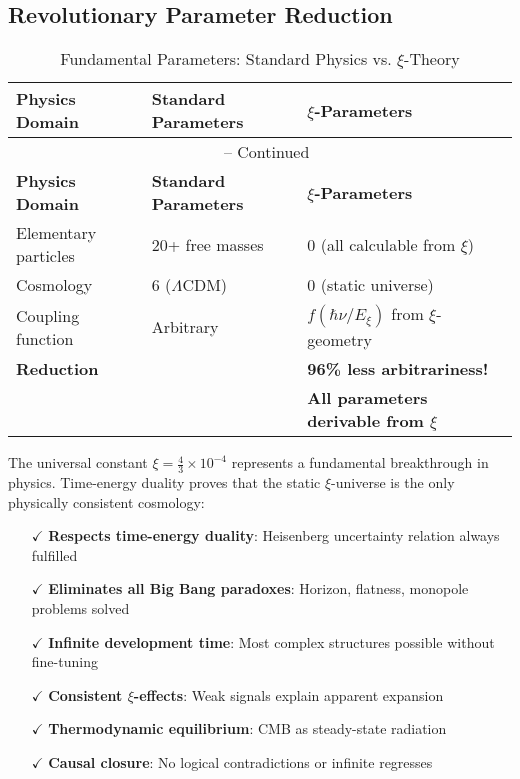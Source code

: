 \documentclass[12pt,a4paper]{article}
\theoremstyle{definition}
\begin{document}
	\subsection{Revolutionary Parameter Reduction}
	
	\begin{longtable}{lll}
		\caption{Fundamental Parameters: Standard Physics vs. $\xi$-Theory} \\
		\toprule
		\textbf{Physics Domain} & \textbf{Standard Parameters} & \textbf{$\xi$-Parameters} \\
		\midrule
		\endfirsthead
		\multicolumn{3}{c}{\tablename\ \thetable{} -- Continued} \\
		\toprule
		\textbf{Physics Domain} & \textbf{Standard Parameters} & \textbf{$\xi$-Parameters} \\
		\midrule
		\endhead
		Elementary particles & 20+ free masses & 0 (all calculable from $\xi$) \\
		Cosmology & 6 ($\Lambda$CDM) & 0 (static universe) \\
		Coupling function & Arbitrary & $f(\hbar\nu/E_\xi)$ from $\xi$-geometry \\
		\midrule
		\textbf{Reduction} & & \textbf{96\% less arbitrariness!} \\
		& & \textbf{All parameters derivable from $\xi$} \\
		\bottomrule
	\end{longtable}
	
	\begin{revolutionary}
		The universal constant $\xi = \frac{4}{3} \times 10^{-4}$ represents a fundamental breakthrough in physics. Time-energy duality proves that the static $\xi$-universe is the only physically consistent cosmology:
		
		\begin{itemize}
			\item[$\checkmark$] \textbf{Respects time-energy duality}: Heisenberg uncertainty relation always fulfilled
			\item[$\checkmark$] \textbf{Eliminates all Big Bang paradoxes}: Horizon, flatness, monopole problems solved
			\item[$\checkmark$] \textbf{Infinite development time}: Most complex structures possible without fine-tuning
			\item[$\checkmark$] \textbf{Consistent $\xi$-effects}: Weak signals explain apparent expansion
			\item[$\checkmark$] \textbf{Thermodynamic equilibrium}: CMB as steady-state radiation
			\item[$\checkmark$] \textbf{Causal closure}: No logical contradictions or infinite regresses
		\end{itemize}
	\end{revolutionary}
	
\end{document}
